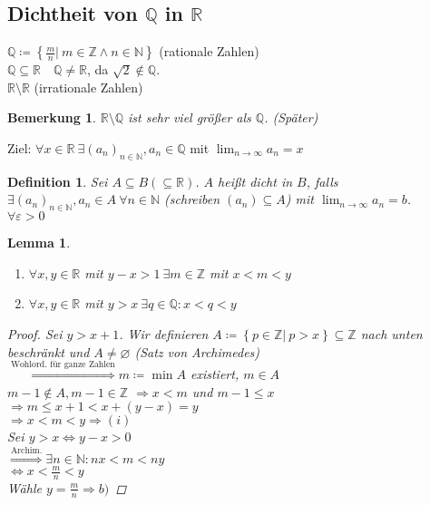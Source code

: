 \documentclass[11pt, twoside, a4paper]{article}
\theoremstyle{plain}
\newtheorem{bemerkung}[blockelement]{Bemerkung}
\newtheorem{definition}[blockelement]{Definition}
\newtheorem{lemma}[blockelement]{Lemma}
\newcommand{\set}[1]{\left\{#1\right\}}
\newcommand{\equivalent}[0]{\Leftrightarrow{}}
\newcommand{\impl}[0]{\Rightarrow{}}
\newcommand{\definedas}[0]{\coloneqq}
\newcommand{\exclude}[0]{\setminus}
\renewcommand{\emptyset}{\varnothing}
\newcommand{\annot}[2]{\overset{\text{#2}}{#1}}
\newcommand{\nn}[0]{\\[2\baselineskip]}
\newcommand{\theoremescape}{\leavevmode}
\newcommand{\fromto}{\rightarrow{}}
\newcommand{\naturalnumbers}{\mathbb{N}}
\newcommand{\realnumbers}{\mathbb{R}}
\begin{document}
    \newpage

    \subsection{Dichtheit von $\mathbb{Q}$ in $\mathbb{R}$}

    $\mathbb{Q}\definedas\set{\frac{m}{n}|~m\in\mathbb{Z} \land n\in\naturalnumbers}$ (rationale Zahlen)\\
    $\mathbb{Q}\subseteq \realnumbers\quad \mathbb{Q}\neq\mathbb{R}$, da $\sqrt{2}\notin \mathbb{Q}$.\\
    $\mathbb{R}\exclude\realnumbers$ (irrationale Zahlen)

    \begin{bemerkung}
        $\realnumbers\exclude\mathbb{Q}$ ist sehr viel größer als $\mathbb{Q}$. (Später)
    \end{bemerkung}

    \noindent Ziel: $\forall x\in\realnumbers~\exists (a_n)_{n\in\naturalnumbers}, a_n\in\mathbb{Q}$ mit $\lim_{n\fromto\infty} a_n =x$

    \begin{definition} %
        Sei $A\subseteq B (\subseteq \realnumbers)$. $A$ heißt dicht in $B$, falls $\exists (a_n)_{n\in\naturalnumbers}, a_n \in A~\forall n\in\naturalnumbers$ (schreiben $(a_n)\subseteq A$) mit $\lim_{n\fromto\infty} a_n = b$.\\
        $\forall \varepsilon > 0$
    \end{definition}

    \begin{lemma} %
        \theoremescape
        \begin{enumerate}[label=(\roman*)]
            \item $\forall x,y\in\realnumbers$ mit $y-x>1~\exists m\in\mathbb{Z}$ mit $x < m < y$
            \item $\forall x,y\in\realnumbers$ mit $y>x~\exists q\in\mathbb{Q}\colon x<q<y$
        \end{enumerate}
        \begin{proof}
            Sei $y>x+1$. Wir definieren $A\definedas\set{p\in\mathbb{Z}|~p>x} \subseteq \mathbb{Z}$ nach unten beschränkt und $A\neq \emptyset$ (Satz von Archimedes)\\
            $\annot{\impl}{Wohlord. für ganze Zahlen} m\definedas\min A$ existiert, $m\in A$\\
            $m-1\notin A, m-1\in \mathbb{Z}$
            $\impl x < m$ und $m-1 \leq x$\\
            $\impl m\leq x+1< x+(y-x) = y$\\
            $\impl x<m<y \impl (i)$\nn

            Sei $y>x\equivalent y-x>0$\\
            $\annot{\impl}{Archim.} \exists n\in\naturalnumbers\colon nx < m < ny$\\
            $\equivalent x < \frac{m}{n}< y$\\
            Wähle $y=\frac{m}{n} \impl b)$
        \end{proof}
    \end{lemma}
\end{document}
